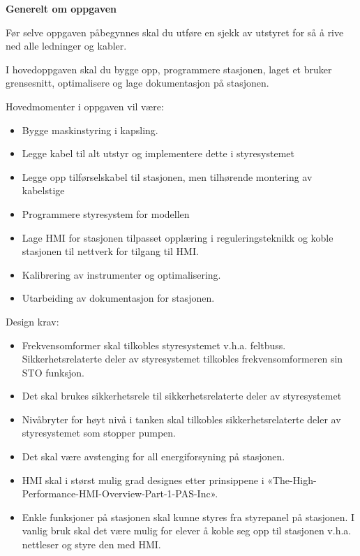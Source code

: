 \textbf{Generelt om oppgaven }

Før selve oppgaven påbegynnes skal du utføre en sjekk av utstyret for så å rive ned alle ledninger og kabler. 

I hovedoppgaven skal du bygge opp, programmere stasjonen, laget et bruker grensesnitt, optimalisere og lage dokumentasjon på stasjonen. 

 

 Hovedmomenter i oppgaven vil være: 
\begin{itemize}[noitemsep]
	\item Bygge maskinstyring i kapsling.  
	\item Legge kabel til alt utstyr og implementere dette i styresystemet
	\item Legge opp tilførselskabel til stasjonen, men tilhørende montering av kabelstige 
	\item Programmere styresystem for modellen 
	\item Lage HMI for stasjonen tilpasset opplæring i reguleringsteknikk og koble stasjonen til  nettverk for tilgang til HMI.  
	\item Kalibrering av instrumenter og optimalisering. 
	\item Utarbeiding av dokumentasjon for stasjonen. 
\end{itemize}



 

 Design krav:  
\begin{itemize}[noitemsep]
	\item Frekvensomformer skal tilkobles styresystemet v.h.a. feltbuss. Sikkerhetsrelaterte deler av styresystemet tilkobles frekvensomformeren sin STO funksjon.  
	\item Det skal brukes sikkerhetsrele til sikkerhetsrelaterte deler av styresystemet
	\item Nivåbryter for høyt nivå i tanken skal tilkobles sikkerhetsrelaterte deler av styresystemet som stopper pumpen.
	\item Det skal være avstenging for all energiforsyning på stasjonen.  
	\item HMI skal i størst mulig grad designes etter prinsippene i «The-High-Performance-HMI-Overview-Part-1-PAS-Inc».  
	\item Enkle funksjoner på stasjonen skal kunne styres fra styrepanel på stasjonen. I vanlig bruk skal det være mulig for elever å koble seg opp til stasjonen v.h.a. nettleser og styre den med HMI.  
\end{itemize}


